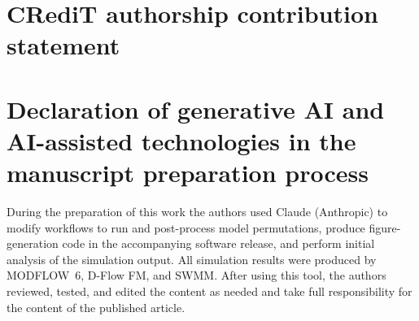 \documentclass[preprint,authoryear,11pt]{elsarticle}
\begin{document}
\section*{CRediT authorship contribution statement}


\section*{Declaration of generative AI and AI-assisted technologies in the manuscript preparation process}

During the preparation of this work the authors used Claude (Anthropic) to modify workflows to run and post-process model permutations, produce figure-generation code in the accompanying software release, and perform initial analysis of the simulation output. All simulation results were produced by MODFLOW~6, D-Flow FM, and SWMM. After using this tool, the authors reviewed, tested, and edited the content as needed and take full responsibility for the content of the published article.

%
%
%
\end{document}
